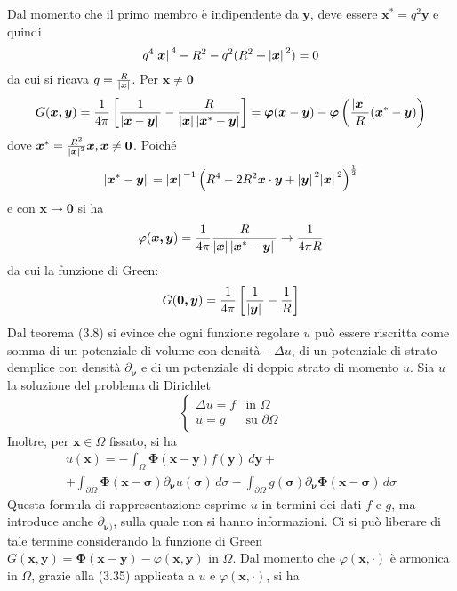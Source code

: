 \documentclass[a4paper,12pt, draft]{article}
\theoremstyle{break}
\let\phi\varphi
\numberwithin{equation}{section}
\begin{document}
Dal momento che il primo membro è indipendente da \(\bm{y}\), deve essere \(\bm{x}^* = q^2\bm{y}\) e quindi
\[
  q^4\abs*{\bm{x}}^4 - R^2 - q^2(R^2 + \abs*{\bm{x}}^2) = 0
\]
da cui si ricava \(q =\frac{R}{\abs*{\bm{x}}}\). Per \(\bm{x} \not = \bm{0}\)
\begin{equation}
  G(\bm{x, y}) = \frac{1}{4\pi} \left[ \frac{1}{\abs*{\bm{x} - \bm{y}}} - \frac{R}{\abs*{\bm{x}} \abs{\bm{x}^* - \bm{y}}}\right] = \bm{\phi}(\bm{x} - \bm{y}) - \bm{\phi}\left(\frac{\abs*{\bm{x}}}{R} (\bm{x}^* - \bm{y})\right) 
\end{equation}
dove \(\bm{x}^* = \frac{R^2}{\abs*{\bm{x}}^2 }\bm{x}, \bm{x} \not = \bm{0}\). Poiché
\[
  \abs*{\bm{x}^* - \bm{y}} = \abs*{\bm{x}}^{-1} \left( R^4 - 2R^2\bm{x} \cdot \bm{y} + \abs*{\bm{y}}^2 \abs*{\bm{x}}^2\right)^{\frac{1}{2}}
\]
e con \(\bm{x} \to \bm{0}\) si ha
\[
  \phi(\bm{x,y}) = \frac{1}{4\pi}\frac{R}{\abs*{\bm{x}} \abs*{\bm{x}^* - \bm{y}}} \to \frac{1}{4\pi R}
\]
da cui la funzione di Green:
\begin{equation}
  G(\bm{0, y}) = \frac{1}{4\pi} \left[\frac{1}{\abs*{\bm{y}}} - \frac{1}{R}\right]
\end{equation}
Dal teorema (3.8) si evince che ogni funzione regolare \(u\) può essere riscritta come somma di un potenziale di volume con densità \(-\Delta u\), di un potenziale di strato demplice con densità \(\partial_{\bm{\nu}}\) e di un potenziale di doppio strato di momento \(u\). 
Sia \(u\) la soluzione del problema di Dirichlet 
\begin{equation}
  \begin{cases}
    \Delta u = f & \mbox{in }\Omega \\
    u = g & \mbox{su } \partial\Omega
  \end{cases}
\end{equation}
Inoltre, per \(\bm{x} \in \Omega\) fissato, si ha
\begin{equation}
  \begin{array}{c}
    u(\bm{x}) = - \int_{\Omega} \bm{\Phi}(\bm{x} - \bm{y})f(\bm{y}) \, d\bm{y} + \\
    + \int_{\partial\Omega} \bm{\Phi}(\bm{x} - \bm{\sigma})\partial_{\bm{\nu}}u(\bm{\sigma}) \, d\sigma - \int_{\partial\Omega} g(\bm{\sigma}) \partial_{\bm{\nu}} \bm{\Phi}(\bm{x} -\bm{\sigma}) \, d\sigma
  \end{array}
\end{equation}
Questa formula di rappresentazione esprime \(u\) in termini dei dati \(f \mbox{ e }g\), ma introduce anche \(\partial_{\bm{\nu})}\), sulla quale non si hanno informazioni. Ci si può liberare di tale termine considerando la funzione di Green \(G(\bm{x, y}) = \bm{\Phi} (\bm{x} - \bm{y}) - \phi(\bm{x,y})\) in \(\Omega\). Dal momento che \(\phi(\bm{x,\cdot})\) è armonica in \(\Omega\), grazie alla (3.35) applicata a \(u \mbox{ e }\phi(\bm{x, \cdot})\), si ha
\end{document}
